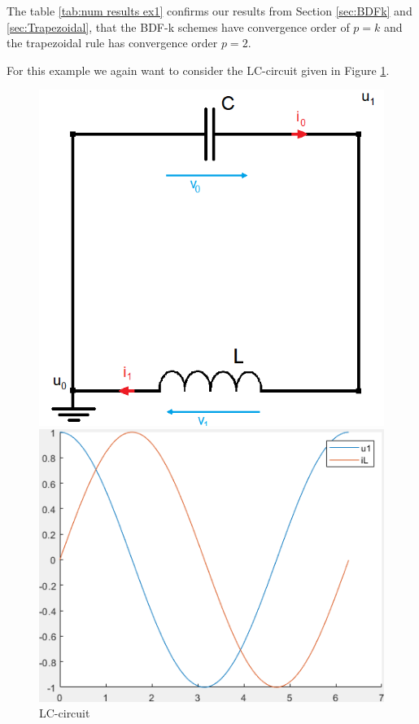 \begin{example1}
	The table \ref{tab:num results ex1} confirms our results from Section \ref{sec:BDFk} and \ref{sec:Trapezoidal}, that the BDF-k schemes have convergence order of $p=k$ and the trapezoidal rule has convergence order $p=2$.
\end{example1}
		
	
\begin{example2}
	For this example we again want to consider the LC-circuit given in Figure \ref{fig: LC-circuit}.
	
	\begin{figure}[H]
		\centering
		\begin{minipage}{.5\textwidth}
			\centering
			\includegraphics[width=\linewidth]{pictures/Example2_index0.png}
			\caption{LC-circuit}
			\label{fig: LC-circuit}
		\end{minipage}%
		\begin{minipage}{.5\textwidth}
			\centering
			\includegraphics[width=\linewidth]{pictures/exact_solution_ex2.png}

\end{minipage}
\end{figure}
\end{example2}
